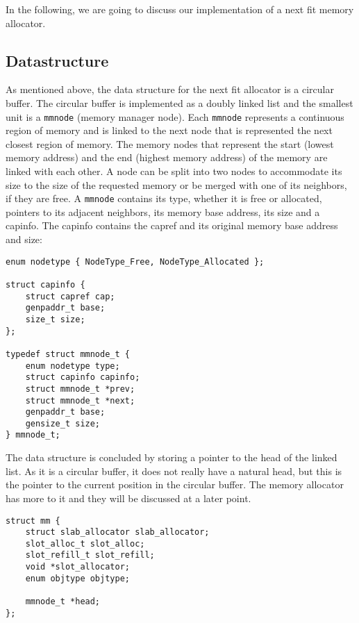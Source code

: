 In the following, we are going to discuss our implementation of a next fit memory
allocator.


\subsection{Datastructure}\label{subsec:mm-tracker}

As mentioned above, the data structure for the next fit allocator is a circular
buffer.  The circular buffer is implemented as a doubly linked list and the
smallest unit is a \texttt{mmnode} (memory manager node).  Each \texttt{mmnode} represents
a continuous region of memory and is linked to the next node that is represented the
next closest region of memory. The memory nodes that represent the start (lowest
memory address) and the end (highest memory address) of the memory are linked
with each other.  A node can be split into two nodes to accommodate its size to
the size of the requested memory or be merged with one of its neighbors, if
they are free.  A \texttt{mmnode} contains its type, whether it is free or allocated,
pointers to its adjacent neighbors, its memory base address, its size and a
capinfo. The capinfo contains the capref and its original memory base address
and size:

\begin{verbatim}
enum nodetype { NodeType_Free, NodeType_Allocated };

struct capinfo {
    struct capref cap;
    genpaddr_t base;
    size_t size;
};

typedef struct mmnode_t {
    enum nodetype type;
    struct capinfo capinfo;
    struct mmnode_t *prev;
    struct mmnode_t *next;
    genpaddr_t base;
    gensize_t size;
} mmnode_t;
\end{verbatim}

The data structure is concluded by storing a pointer to the head of the linked
list. As it is a circular buffer, it does not really have a natural head, but
this is the pointer to the current position in the circular buffer. The memory
allocator has more to it and they will be discussed at a later point.

\begin{verbatim}
struct mm {
    struct slab_allocator slab_allocator;
    slot_alloc_t slot_alloc;
    slot_refill_t slot_refill;
    void *slot_allocator;
    enum objtype objtype;

    mmnode_t *head;
};
\end{verbatim}

